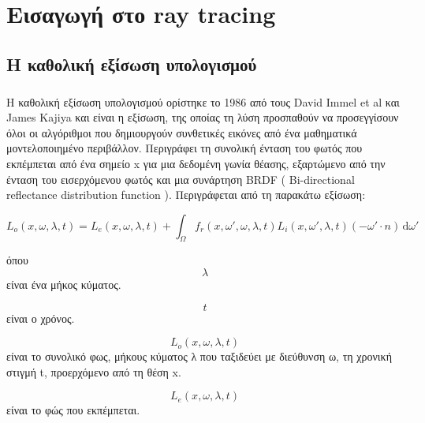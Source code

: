 \chapter{Εισαγωγή στο ray tracing}

\begin{sloppypar}

\section{H καθολική εξίσωση υπολογισμού}

\paragraph{}
	Η καθολική εξίσωση υπολογισμού ορίστηκε το 1986 από τους David Immel et al και James Kajiya και είναι η εξίσωση, της οποίας 
τη λύση προσπαθούν να προσεγγίσουν όλοι οι αλγόριθμοι που δημιουργούν συνθετικές εικόνες από ένα μαθηματικά μοντελοποιημένο 
περιβάλλον. Περιγράφει τη συνολική ένταση του φωτός που εκπέμπεται από ένα σημείο x για μια δεδομένη γωνία θέασης, εξαρτώμενο 
από την ένταση του εισερχόμενου φωτός και μια συνάρτηση BRDF ( Bi-directional reflectance distribution function ). Περιγράφεται 
από τη παρακάτω εξίσωση:

\begin{equation}
L_o (x, \omega, \lambda, t) = L_e (x, \omega , \lambda , t) + \int_\Omega f_r(x, \omega', \omega, \lambda, t) L_i(x, \omega', \lambda, t)(-\omega' \cdot n) \, \mathrm{d}\omega'
\end{equation}

όπου\\

\begin{equation}
	\lambda
\end{equation}
είναι ένα μήκος κύματος.

\begin{equation}
	t
\end{equation}
είναι ο χρόνος.

\begin{equation}
	L_o (x, \omega, \lambda, t)
\end{equation}
είναι το συνολικό φως, μήκους κύματος λ που ταξιδεύει με διεύθυνση ω, τη χρονική στιγμή t, προερχόμενο από τη θέση x.

\begin{equation}
	L_e (x, \omega , \lambda , t)
\end{equation}
είναι το φώς που εκπέμπεται.


\end{sloppypar}
